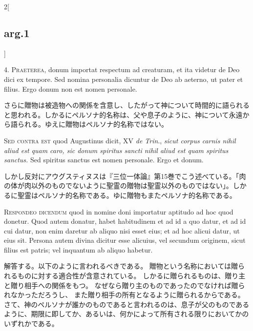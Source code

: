\documentclass[paper=a4paper,fontsize=10pt,jafontsize=9pt,titlepage]{jlreq}
\begin{document}
\begin{paracol}{2}[\subsection{arg.1}]

4. \textsc{Praeterea}, donum importat respectum ad creaturam, et ita videtur de Deo dici ex tempore. Sed nomina personalia dicuntur de Deo ab aeterno, ut pater et filius. Ergo donum non est nomen personale.

\switchcolumn

さらに贈物は被造物への関係を含意し、したがって神について時間的に語られると思われる。しかるにペルソナ的名称は、父や息子のように、神について永遠から語られる。ゆえに贈物はペルソナ的名称ではない。

\switchcolumn*[\subsection{s.c.}]

\textsc{Sed contra est} quod Augustinus dicit, XV \textit{de Trin}., \textit{sicut corpus carnis nihil aliud est quam caro, sic donum spiritus sancti nihil aliud est quam spiritus sanctus.} Sed spiritus sanctus est nomen personale. Ergo et donum.

\switchcolumn

しかし反対にアウグスティヌスは『三位一体論』第15巻でこう述べている。「肉の体が肉以外のものでないように聖霊の贈物は聖霊以外のものではない」。しかるに聖霊はペルソナ的名称である。ゆに贈物もまたペルソナ的名称である。


\textsc{Respondeo dicendum} quod in nomine doni importatur aptitudo ad hoc quod donetur.
Quod autem donatur, habet habitudinem et ad id a quo datur, et ad id cui datur,
non enim daretur ab aliquo nisi esset eius; et ad hoc alicui datur, ut eius
sit. Persona autem divina dicitur esse alicuius, vel secundum originem, sicut
filius est patris; vel inquantum ab aliquo habetur.

\switchcolumn

解答する。以下のように言われるべきである。
贈物という名称においては贈られるものに対する適合性が含意されている。
しかるに贈られるものは、贈り主と贈り相手への関係をもつ。
なぜなら贈り主のものであったのでなければ贈られなかっただろうし、
また贈り相手の所有となるように贈られるからである。
さて、神のペルソナが誰かのものであると言われるのは、息子が父のものであるように、期限に即してか、あるいは、何かによって所有される限りにおいてかのいずれかである。


\end{paracol}
\end{document}
